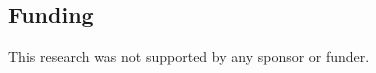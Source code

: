 \documentclass[12pt,a4paper]{amsart}
\begin{document}
\subsection*{Funding} This research was not supported by any sponsor or funder.










\end{document}
